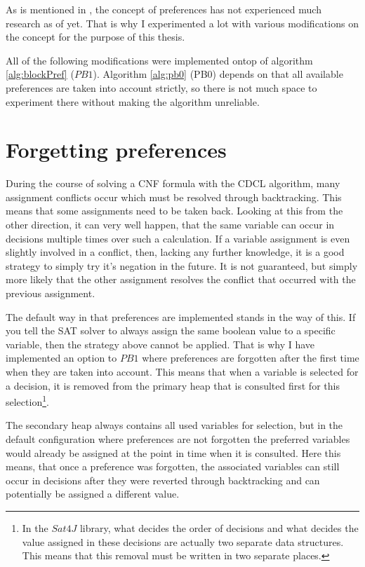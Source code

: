 As is mentioned in \cite{PJ18}, the concept of preferences has not experienced much research as of yet. That is why I experimented a lot with various modifications on the concept for the purpose of this thesis.

All of the following modifications were implemented ontop of algorithm \ref{alg:blockPref} ($PB1$). Algorithm \ref{alg:pb0} (PB0) depends on that all available preferences are taken into account strictly, so there is not much space to experiment there without making the algorithm unreliable. 


\section{Forgetting preferences}
\label{sec:amnesPrefs}
During the course of solving a CNF formula with the CDCL algorithm, many assignment conflicts occur which must be resolved through backtracking. This means that some assignments need to be taken back. Looking at this from the other direction, it can very well happen, that the same variable can occur in decisions multiple times over such a calculation. If a variable assignment is even slightly involved in a conflict, then, lacking any further knowledge, it is a good strategy to simply try it's negation in the future. It is not guaranteed, but simply more likely that the other assignment resolves the conflict that occurred with the previous assignment. 

The default way in that preferences are implemented stands in the way of this. If you tell the SAT solver to always assign the same boolean value to a specific variable, then the strategy above cannot be applied. That is why I have implemented an option to $PB1$ where preferences are forgotten after the first time when they are taken into account. This means that when a variable is selected for a decision, it is removed from the primary heap that is consulted first for this selection\footnote{
	In the $Sat4J$ library, what decides the order of decisions and what decides the value assigned in these decisions are actually two separate data structures. This means that this removal must be written in two separate places.
}. 

The secondary heap always contains all used variables for selection, but in the default configuration where preferences are not forgotten the preferred variables would already be assigned at the point in time when it is consulted. Here this means, that once a preference was forgotten, the associated variables can still occur in decisions after they were reverted through backtracking and can potentially be assigned a different value. 

